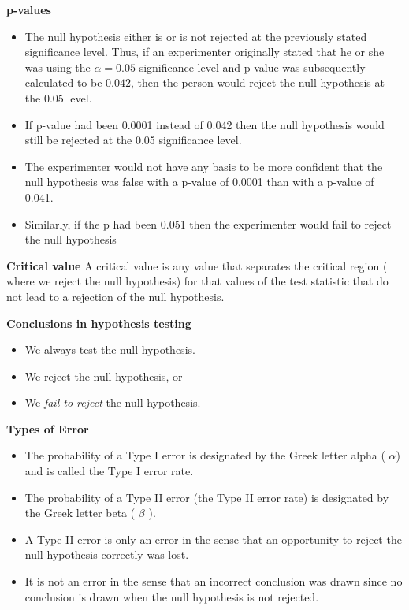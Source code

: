 
\noindent \textbf{p-values}
\large
\begin{itemize}
\item The null hypothesis either is or is not rejected at the previously stated significance level. Thus, if an experimenter originally stated that he or she was using the $\alpha = 0.05$ significance level and p-value was subsequently calculated to be $0.042$, then the person would reject the null hypothesis at the 0.05 level. \item If p-value had been 0.0001 instead of 0.042 then the null hypothesis would still be rejected at the 0.05 significance level.  \item
The experimenter would not have any basis to be more confident that the null hypothesis was false with a p-value of 0.0001 than with a p-value of 0.041. \item Similarly, if the p had been 0.051 then the experimenter would fail to reject the null hypothesis
\end{itemize}


{
\noindent \textbf{Critical value}
A critical value is any value that separates the critical region ( where we reject the null hypothesis) for that values of the test statistic that do not lead to a rejection of the null hypothesis.

}







{
\noindent \textbf{Conclusions in hypothesis testing}
\begin{itemize}
\item We always test the null hypothesis.
\item We reject the null hypothesis, or
\item We \emph{ fail to reject} the null hypothesis.
\end{itemize}
}

\noindent \textbf{Types of Error}
\begin{itemize}
\item The probability of a Type I error is designated by the Greek letter alpha ( $\alpha$) and is called the Type I error rate.
\item The probability of a Type II error (the Type II error rate) is designated by the Greek letter beta ( $\beta$ ).
\item A Type II error is only an error in the sense that an opportunity to reject the null hypothesis correctly was lost.
\item It is not an error in the sense that an incorrect conclusion was drawn since no conclusion is drawn when the null hypothesis is not rejected.
\end{itemize}

